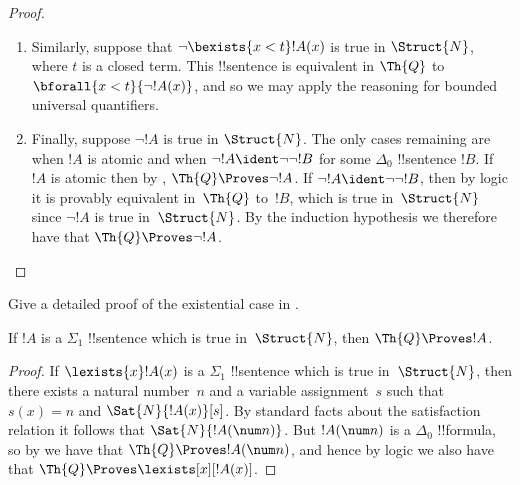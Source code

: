 \documentclass[../../../include/open-logic-section]{subfiles}
\begin{document}
\begin{proof}
\begin{enumerate}
%
\item Similarly, suppose that $\lnot \bexists{x<t}!A(x)$ is
true in $\Struct{N}$, where $t$ is a closed term. This
!!{sentence} is equivalent in $\Th{Q}$ to
$\bforall{x<t}{\lnot!A(x)}$, and so we may apply the reasoning
for bounded universal quantifiers.
%
\item Finally, suppose $\lnot !A$ is true in $\Struct{N}$.
The only cases remaining are when $!A$ is atomic and when
$\lnot !A \ident \lnot\lnot !B$ for some $\Delta_0$
!!{sentence} $!B$. If $!A$ is atomic then by
, $\Th{Q} \Proves \lnot !A$.
If $\lnot !A \ident \lnot\lnot !B$, then by logic it is
provably equivalent in~$\Th{Q}$ to~$!B$, which is true 
in~$\Struct{N}$ since $\lnot !A$ is true in~$\Struct{N}$.
By the induction hypothesis we therefore have that
$\Th{Q} \Proves \lnot !A$.
\end{enumerate}
\end{proof}

\begin{prob}
Give a detailed proof of the existential case in
.
\end{prob}

\begin{thm}
If $!A$ is a $\Sigma_1$ !!{sentence} which is true
in~$\Struct{N}$, then $\Th{Q} \Proves !A$.
\end{thm}

\begin{proof}
If $\lexists{x}!A(x)$ is a $\Sigma_1$ !!{sentence} which
is true in~$\Struct{N}$, then there exists a natural
number~$n$ and a variable assignment~$s$ such that $s(x) = n$ and
$\Sat{N}{!A(x)}[s]$. By standard facts about
the satisfaction relation it follows that
$\Sat{N}{!A(\num n)}$. But $!A(\num n)$ is a
$\Delta_0$ !!{formula}, so by 
we have that $\Th{Q} \Proves !A(\num n)$, and hence by
logic we also have that $\Th{Q} \Proves \lexists[x][!A(x)]$.
\end{proof}
\end{document}
